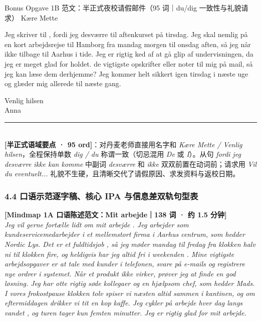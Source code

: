 \begin{emailbox}{Bonus Opgave 1B 范文：半正式夜校请假邮件（95 词｜du/dig 一致性与礼貌请求）}
Kære Mette

Jeg skriver til , fordi jeg desværre  til aftenkurset på tirsdag. Jeg skal nemlig på en kort arbejdsrejse til Hamborg fra mandag morgen til onsdag aften, så jeg når ikke tilbage til Aarhus i tide. Jeg er rigtig ked af at gå glip af undervisningen, da jeg er meget glad for holdet.  de vigtigste opskrifter eller noter til mig på mail, så jeg kan læse dem derhjemme? Jeg kommer helt sikkert igen tirsdag i næste uge og glæder mig allerede til næste gang.

Venlig hilsen\\
Anna

\vspace{0.3em}
\rule{\linewidth}{0.4pt}\\[0.2em]
\small\textbf{\color{NCDGold}[半正式语域要点 · 95 ord]}：对丹麦老师直接用名字和 \textit{Kære Mette / Venlig hilsen}，全程保持单数 \textit{dig / du} 称谓一致（切忌混用 \textit{De} 或 \textit{I}）。从句 \textit{fordi jeg desværre ikke kan komme} 中副词 \textit{desværre} 和 \textit{ikke} 双双前置在动词前；请求用 \textit{Vil du eventuelt...} 礼貌不生硬，且清晰交代了请假原因、求发资料与返校日期。
\end{emailbox}

\subsubsection*{4.4 口语示范逐字稿、核心 IPA 与信息差双轨句型表}

\begin{transbox}
\small
\textbf{\color{NCDNavy}[Mindmap 1A 口语陈述范文：Mit arbejde｜138 词 · 约 1.5 分钟]}\\
\textit{Jeg vil gerne fortælle lidt om mit arbejde . Jeg arbejder som kundeservicemedarbejder i et mellemstort firma i Aarhus centrum, som hedder Nordic Lys. Det er et fuldtidsjob , så jeg møder mandag til fredag fra klokken halv ni til klokken fire, og heldigvis har jeg altid fri i weekenden . Mine vigtigste arbejdsopgaver  er at tale med kunder i telefonen, svare på e-mails og registrere nye ordrer i systemet. Når et produkt ikke virker, prøver jeg at finde en god løsning. Jeg har otte rigtig søde kollegaer  og en hjælpsom chef, som hedder Mads. I vores frokostpause  klokken tolv spiser vi næsten altid sammen i kantinen, og om eftermiddagen drikker vi tit en kop kaffe. Jeg cykler  på arbejde hver dag langs vandet , og turen tager kun femten minutter. Jeg er rigtig glad for mit arbejde.}
\end{transbox}

